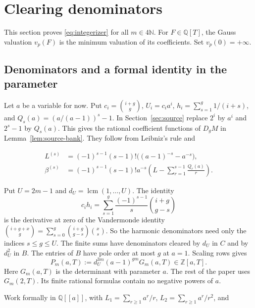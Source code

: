\section{Clearing denominators}\label{sec:integerization}

This section proves \eqref{eq:integerizer} for all \(m\in4\mathbb N\). For
\(F\in\mathbb Q[T]\), the Gauss valuation \(v_p(F)\) is the minimum
valuation of its coefficients. Set \(v_p(0)=+\infty\).

\subsection{Denominators and a formal identity in the parameter}

Let \(a\) be a variable for now. Put \(c_i=\binom{i+g}{g}\),
\(U_i=c_i a^i\), \(h_i=\sum_{s=1}^g1/(i+s)\), and
\(Q_s(a)=(a/(a-1))^s-1\). In Section~\ref{sec:source} replace \(2^i\) by
\(a^i\) and \(2^s-1\) by \(Q_s(a)\). This gives the rational coefficient
functions of \(D_gM\) in Lemma~\ref{lem:source-bank}. They follow from
Leibniz's rule and

\[
 \begin{aligned}
 L^{(s)}&=(-1)^{s-1}(s-1)!\bigl((a-1)^{-s}-a^{-s}\bigr),\\
 \beta^{(s)}&=(-1)^{s-1}(s-1)!a^{-s}
          \left(L-\sum_{r=1}^{s-1}\frac{Q_r(a)}r\right).
 \end{aligned}
\]

Put \(U=2m-1\) and \(d_U=\operatorname{lcm}(1,\ldots,U)\). The identity
\begin{equation}\label{eq:int-harmonic}
 c_i h_i=\sum_{s=1}^g\frac{(-1)^{s-1}}s\binom{i+g}{g-s}
\end{equation}
is the derivative at zero of the Vandermonde identity
\(\binom{i+g+x}{g}=\sum_{s=0}^g\binom{i+g}{g-s}\binom{x}{s}\). So the
harmonic denominators need only the indices \(s\le g\le U\). The finite sums
have denominators cleared by \(d_U\) in \(C\) and by \(d_U^2\) in \(B\).
The entries of \(B\) have pole order at most \(g\) at \(a=1\). Scaling rows
gives
\begin{equation}\label{eq:int-Pm}
 P_m(a,T):=d_U^{3m}(a-1)^{gm}G_m(a,T)\in\mathbb Z[a,T].
\end{equation}
Here \(G_m(a,T)\) is the determinant with parameter \(a\). The rest of the
paper uses \(G_m(2,T)\). Its finite rational formulas contain no negative
powers of \(a\).

Work formally in \(\mathbb Q[[a]]\), with \(L_1=\sum_{r\ge1}a^r/r\), \(L_2=\sum_{r\ge1}a^r/r^2\),
and

